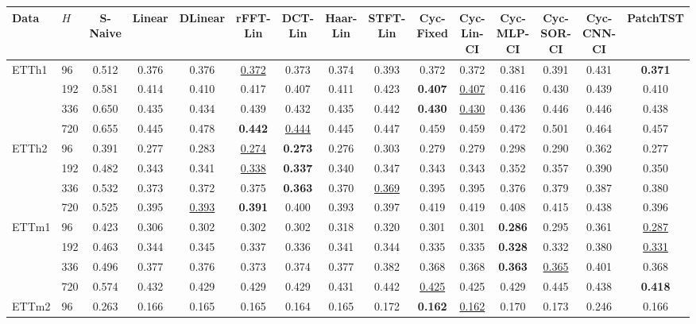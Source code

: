 \begin{tabular}{llccccccccccccc}
\toprule
Data & $H$ & S-Naive & Linear & DLinear & rFFT-Lin & DCT-Lin & Haar-Lin & STFT-Lin & Cyc-Fixed & Cyc-Lin-CI & Cyc-MLP-CI & Cyc-SOR-CI & Cyc-CNN-CI & PatchTST \\
\midrule
ETTh1 & 96 & 0.512 & 0.376 & 0.376 & \underline{0.372} & 0.373 & 0.374 & 0.393 & 0.372 & 0.372 & 0.381 & 0.391 & 0.431 & \textbf{0.371} \\
 & 192 & 0.581 & 0.414 & 0.410 & 0.417 & 0.407 & 0.411 & 0.423 & \textbf{0.407} & \underline{0.407} & 0.416 & 0.430 & 0.439 & 0.410 \\
 & 336 & 0.650 & 0.435 & 0.434 & 0.439 & 0.432 & 0.435 & 0.442 & \textbf{0.430} & \underline{0.430} & 0.436 & 0.446 & 0.446 & 0.438 \\
 & 720 & 0.655 & 0.445 & 0.478 & \textbf{0.442} & \underline{0.444} & 0.445 & 0.447 & 0.459 & 0.459 & 0.472 & 0.501 & 0.464 & 0.457 \\
\midrule
ETTh2 & 96 & 0.391 & 0.277 & 0.283 & \underline{0.274} & \textbf{0.273} & 0.276 & 0.303 & 0.279 & 0.279 & 0.298 & 0.290 & 0.362 & 0.277 \\
 & 192 & 0.482 & 0.343 & 0.341 & \underline{0.338} & \textbf{0.337} & 0.340 & 0.347 & 0.343 & 0.343 & 0.352 & 0.357 & 0.390 & 0.350 \\
 & 336 & 0.532 & 0.373 & 0.372 & 0.375 & \textbf{0.363} & 0.370 & \underline{0.369} & 0.395 & 0.395 & 0.376 & 0.379 & 0.387 & 0.380 \\
 & 720 & 0.525 & 0.395 & \underline{0.393} & \textbf{0.391} & 0.400 & 0.393 & 0.397 & 0.419 & 0.419 & 0.408 & 0.415 & 0.438 & 0.396 \\
\midrule
ETTm1 & 96 & 0.423 & 0.306 & 0.302 & 0.302 & 0.302 & 0.318 & 0.320 & 0.301 & 0.301 & \textbf{0.286} & 0.295 & 0.361 & \underline{0.287} \\
 & 192 & 0.463 & 0.344 & 0.345 & 0.337 & 0.336 & 0.341 & 0.344 & 0.335 & 0.335 & \textbf{0.328} & 0.332 & 0.380 & \underline{0.331} \\
 & 336 & 0.496 & 0.377 & 0.376 & 0.373 & 0.374 & 0.377 & 0.382 & 0.368 & 0.368 & \textbf{0.363} & \underline{0.365} & 0.401 & 0.368 \\
 & 720 & 0.574 & 0.432 & 0.429 & 0.429 & 0.429 & 0.431 & 0.442 & \underline{0.425} & 0.425 & 0.429 & 0.445 & 0.438 & \textbf{0.418} \\
\midrule
ETTm2 & 96 & 0.263 & 0.166 & 0.165 & 0.165 & 0.164 & 0.165 & 0.172 & \textbf{0.162} & \underline{0.162} & 0.170 & 0.173 & 0.246 & 0.166 \\

\end{tabular}
